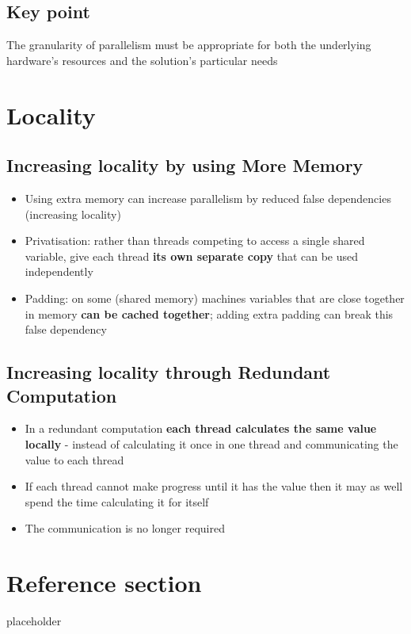 \documentclass{article}
\begin{document}
\subsection{Key point}
\begin{flushleft}
The granularity of parallelism must be appropriate for both the underlying hardware’s resources and the solution’s particular needs
\end{flushleft}

\section{Locality}

\subsection{Increasing locality by using More Memory}
\begin{itemize}
  \item Using extra memory can increase parallelism by reduced false dependencies (increasing locality)
  \item Privatisation: rather than threads competing to access a single shared variable, give each thread \textbf{its own separate copy} that can be used independently
  \item Padding: on some (shared memory) machines variables that are close together in memory \textbf{can be cached together}; adding extra padding can break this false dependency
\end{itemize}

\subsection{Increasing locality through Redundant Computation}
\begin{itemize}
  \item In a redundant computation \textbf{each thread calculates the same value locally} - instead of calculating it once in one thread and communicating the value to each thread
  \item If each thread cannot make progress until it has the value then it may as well spend the time calculating it for itself 
  \item The communication is no longer required
\end{itemize}

\pagebreak
\section*{Reference section} \label{sec:reference}
\begin{description}
	\item[placeholder] \hfill \\
\end{description}
\end{document}
